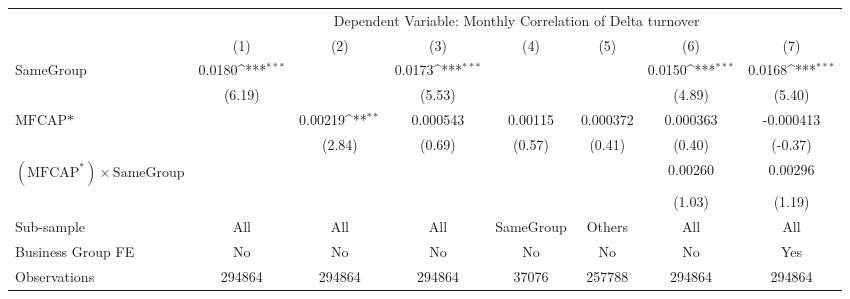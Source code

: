 {
\def\sym#1{\ifmmode^{#1}\else\(^{#1}\)\fi}
\begin{tabular}{l*{7}{c}}
\hline\hline
                    &\multicolumn{7}{c}{Dependent Variable:  Monthly Correlation of Delta turnover}                                                                           \\\cmidrule(lr){2-8}
                    &\multicolumn{1}{c}{(1)}         &\multicolumn{1}{c}{(2)}         &\multicolumn{1}{c}{(3)}         &\multicolumn{1}{c}{(4)}         &\multicolumn{1}{c}{(5)}         &\multicolumn{1}{c}{(6)}         &\multicolumn{1}{c}{(7)}         \\
\hline
SameGroup           &      0.0180\sym{***}&                     &      0.0173\sym{***}&                     &                     &      0.0150\sym{***}&      0.0168\sym{***}\\
                    &      (6.19)         &                     &      (5.53)         &                     &                     &      (4.89)         &      (5.40)         \\
[1em]
$ \text{MFCAP*} $   &                     &     0.00219\sym{**} &    0.000543         &     0.00115         &    0.000372         &    0.000363         &   -0.000413         \\
                    &                     &      (2.84)         &      (0.69)         &      (0.57)         &      (0.41)         &      (0.40)         &     (-0.37)         \\
[1em]
 $ (\text{MFCAP}^*) \times {\text{SameGroup} }  $ &                     &                     &                     &                     &                     &     0.00260         &     0.00296         \\
                    &                     &                     &                     &                     &                     &      (1.03)         &      (1.19)         \\
\hline
Sub-sample          &         All         &         All         &         All         &   SameGroup         &      Others         &         All         &         All         \\
Business Group FE   &          No         &          No         &          No         &          No         &          No         &          No         &         Yes         \\
Observations        &      294864         &      294864         &      294864         &       37076         &      257788         &      294864         &      294864         \\
\hline\hline  \end{tabular}}
